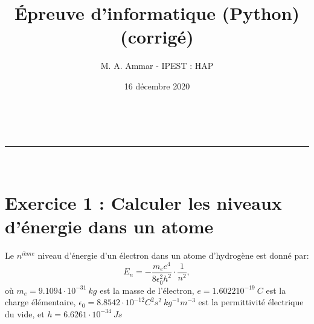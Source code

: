 \documentclass[a4paper,11pt]{article}
\author{M. A. Ammar - IPEST : HAP}
\date{16 décembre 2020}
\makeatletter
\newcommand{\linia}{\rule{\linewidth}{0.5pt}}
\theoremstyle{mytheor}
\renewcommand{\maketitle}{
\begin{center}
\vspace{2ex}
{\huge \textsc{\@title}}
\vspace{1ex}
\\
\linia\\
\@author \hfill \@date
\vspace{4ex}
\end{center}
}
\makeatother
\begin{document}
	
\title{Épreuve d'informatique (Python)  \\ (corrigé)}

\maketitle

\section*{Exercice 1 : Calculer les niveaux d'énergie dans un atome}
Le $n^{ième}$ niveau d'énergie d'un électron dans un atome d'hydrogène est donné par:
\begin{equation}
E_n = -\frac{m_e e^4}{8\epsilon_0^2h^2}\cdot\frac{1}{n^2} ,
\end{equation}
où $m_e = 9.1094⋅10^{-31} \ kg$ est la masse de l'électron, $e = 1.602210^{−19} \ C$ est la charge élémentaire, $\epsilon_0 = 8.8542 \cdot 10^{-12} C^2 s^2 \ kg^{-1}m^{-3}$ est la permittivité électrique du vide, et $h=6.6261 \cdot 10^{−34} \ Js$
\end{document}
